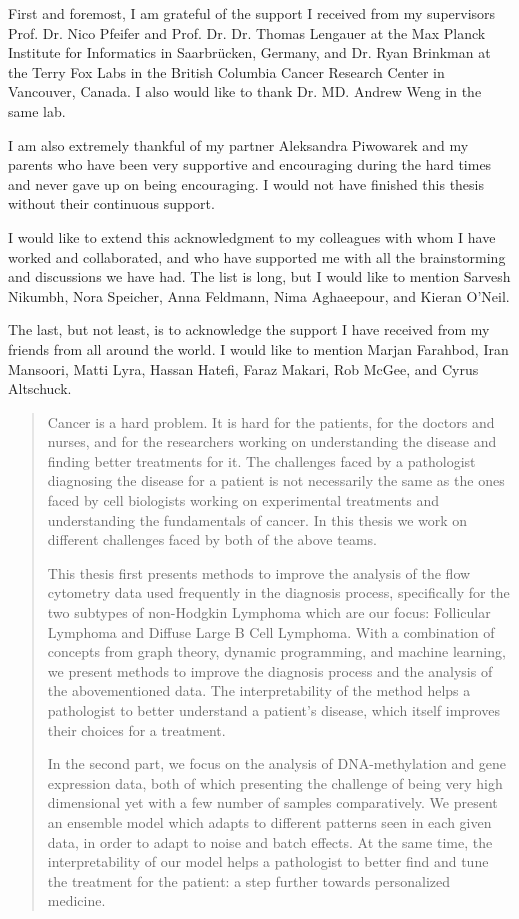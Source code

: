 \documentclass[a4paper,11pt,twoside,openright]{thesis}
\begin{document}
First and foremost, I am grateful of the support I received from my supervisors
Prof. Dr. Nico Pfeifer and Prof. Dr. Dr. Thomas Lengauer at the Max Planck
Institute for Informatics in Saarbr\"ucken, Germany, and Dr. Ryan Brinkman at
the Terry Fox Labs in the British Columbia Cancer Research Center in Vancouver,
Canada. I also would like to thank Dr. MD. Andrew Weng in the same lab.

I am also extremely thankful of my partner Aleksandra Piwowarek and my parents
who have been very supportive and encouraging during the hard times and never
gave up on being encouraging. I would not have finished this thesis without
their continuous support.

I would like to extend this acknowledgment to my colleagues with whom I have
worked and collaborated, and who have supported me with all the brainstorming
and discussions we have had. The list is long, but I would like to mention
Sarvesh Nikumbh, Nora Speicher, Anna Feldmann, Nima Aghaeepour, and Kieran
O'Neil.

The last, but not least, is to acknowledge the support I have received from my
friends from all around the world. I would like to mention Marjan Farahbod,
Iran Mansoori, Matti Lyra, Hassan Hatefi, Faraz Makari, Rob McGee, and Cyrus
Altschuck.

\begin{abstract}
Cancer is a hard problem. It is hard for the patients, for the doctors and
nurses, and for the researchers working on understanding the disease and
finding better treatments for it. The challenges faced by a pathologist
diagnosing the disease for a patient is not necessarily the same as the ones
faced by cell biologists working on experimental treatments and understanding
the fundamentals of cancer. In this thesis we work on different challenges
faced by both of the above teams.

This thesis first presents methods to improve the analysis of the flow
cytometry data used frequently in the diagnosis process, specifically for the
two subtypes of non-Hodgkin Lymphoma which are our focus: Follicular Lymphoma
and Diffuse Large B Cell Lymphoma. With a combination of concepts from graph
theory, dynamic programming, and machine learning, we present methods to
improve the diagnosis process and the analysis of the abovementioned data. The
interpretability of the method helps a pathologist to better understand a
patient's disease, which itself improves their choices for a treatment.

In the second part, we focus on the analysis of DNA-methylation and gene
expression data, both of which presenting the challenge of being very high
dimensional yet with a few number of samples comparatively. We present an
ensemble model which adapts to different patterns seen in each given data, in
order to adapt to noise and batch effects. At the same time, the
interpretability of our model helps a pathologist to better find and tune the
treatment for the patient: a step further towards personalized medicine.
\end{abstract}
\end{document}
